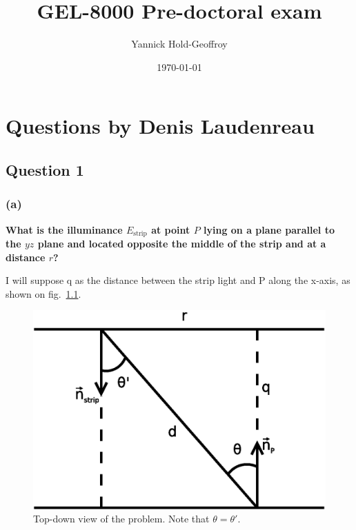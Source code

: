 \documentclass{report}
\title{GEL-8000 Pre-doctoral exam}
\author{Yannick Hold-Geoffroy}
\date{\today}
\begin{document}

\maketitle

\tableofcontents

\hypersetup{colorlinks=true,linkcolor=blue}

\newcommand*\B[1]{\mathbf{#1}}
\newcommand{\boldomega}{\boldsymbol \omega} %
\newcommand{\boldmu}{\boldsymbol \mu} %
\newcommand{\bolddelta}{\boldsymbol \delta} %

\newcommand\norm[1]{\left\lVert#1\right\rVert}

\newcommand\todo[1]{\textcolor{red}{TODO: #1}}

\graphicspath{{figures/}}

\chapter{Questions by Denis Laudenreau}

\section{Question 1}

\subsection{(a)}
\textbf{What is the illuminance $E_{\text{strip}}$ at point $P$ lying on a plane parallel to the $yz$ plane and located opposite the middle of the strip and at a distance $r$?}

I will suppose q as the distance between the strip light and P along the x-axis, as shown on fig.~\ref{q1a:setup}.

\begin{figure}
  \centering
  \includegraphics[width=0.45\linewidth]{q1a_setup.eps}
  \caption[Problem setup]
   {Top-down view of the problem. Note that $\theta = \theta'$.}
  \label{q1a:setup}
\end{figure}
\end{document}
